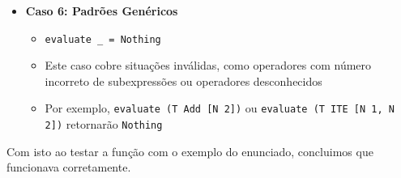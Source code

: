 \documentclass[11pt, a4paper, fleqn]{article}
\begin{document}
\begin{itemize}
    \item \textbf{Caso 6: Padrões Genéricos}
    \begin{itemize}
        \item \texttt{evaluate \_ = Nothing}
        \item Este caso cobre situações inválidas, como operadores com número incorreto de subexpressões ou operadores desconhecidos
        \item Por exemplo, \texttt{evaluate (T Add [N 2])} ou \texttt{evaluate (T ITE [N 1, N 2])} retornarão \texttt{Nothing}
    \end{itemize}
\end{itemize}

Com isto ao testar a função com o exemplo do enunciado, concluimos que funcionava corretamente.


\printindex





\end{document}
